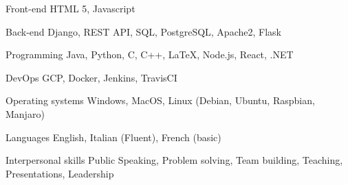 

\begin{cvskills}

  \cvskill
    {Front-end} %
    {HTML 5, Javascript} %

  \cvskill
    {Back-end} %
    {Django, REST API, SQL, PostgreSQL, Apache2, Flask} %

  \cvskill
    {Programming} %
    {Java, Python, C, C++, LaTeX, Node.js, React, .NET} %

    \cvskill
    {DevOps}
    {GCP, Docker, Jenkins, TravisCI}
    
    \cvskill
    {Operating systems}
    {Windows, MacOS, Linux (Debian, Ubuntu, Raspbian, Manjaro)}
    
  \cvskill
    {Languages} %
    {English, Italian (Fluent), French (basic)} %

    \cvskill
    {Interpersonal skills}
    {Public Speaking, Problem solving, Team building, Teaching, Presentations, Leadership}
    
\end{cvskills}
